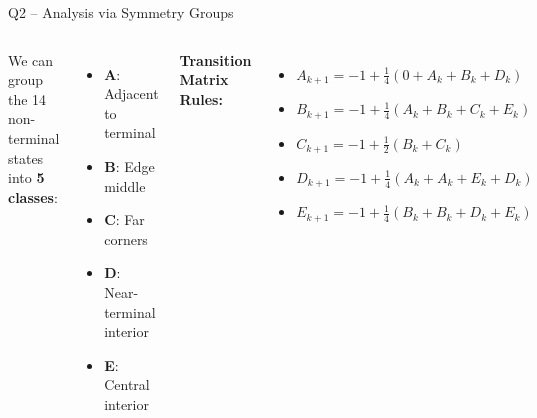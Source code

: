 \documentclass[aspectratio=169,12pt]{beamer}
\begin{document}
\begin{frame}{Q2 -- Analysis via Symmetry Groups}
  \begin{columns}[T]
    We can group the 14 non-terminal states into \textbf{5 classes}:
    \begin{itemize}
      \item \textbf{A}: Adjacent to terminal
      \item \textbf{B}: Edge middle
      \item \textbf{C}: Far corners
      \item \textbf{D}: Near-terminal interior
      \item \textbf{E}: Central interior
    \end{itemize}

    \textbf{Transition Matrix Rules:}
    \scriptsize
    \begin{itemize}
      \item $A_{k+1} = -1 + \frac{1}{4}(0 + A_k + B_k + D_k)$
      \item $B_{k+1} = -1 + \frac{1}{4}(A_k + B_k + C_k + E_k)$
      \item $C_{k+1} = -1 + \frac{1}{2}(B_k + C_k)$
      \item $D_{k+1} = -1 + \frac{1}{4}(A_k + A_k + E_k + D_k)$
      \item $E_{k+1} = -1 + \frac{1}{4}(B_k + B_k + D_k + E_k)$
    \end{itemize}
  \end{columns}
\end{frame}
\end{document}
